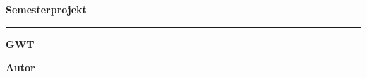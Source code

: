 \begin{titlepage}
{ \flushright \Large{\textbf{Semesterprojekt}}\\
\vspace{0.5cm}
\hrule
}

\vspace{0.5cm} {
  \begin{center}
    \LARGE \textbf{GWT}

    \vspace{0.5cm}
    \Large{\textbf{Autor}}\\
  \end{center}
}
\vspace*{\fill}

		\begin{figure}[htp] {
			\centering
		} \end{figure}
\small \noindent 

\thispagestyle{empty}
\end{titlepage}